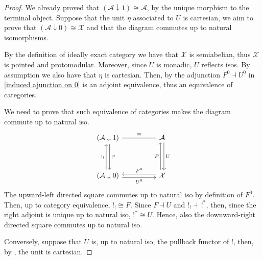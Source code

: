 \begin{subbox}{}
    \begin{proof}
        We already proved that $(\mathcal{A} \downarrow 1) \cong \mathcal{A}$, by the unique morphism to the terminal object. Suppose that the unit $\eta$ associated to $U$ is cartesian, we aim to prove that $(\mathcal{A} \downarrow 0) \cong \mathcal{X}$ and that the diagram commutes up to natural isomorphisms.

        By the definition of ideally exact category we have that $\mathcal{X}$ is semiabelian, thus $\mathcal{X}$ is pointed and protomodular. Moreover, since $U$ is monadic, $U$ reflects isos. By assumption we also have that $\eta$ is cartesian. Then, by  the adjunction $F^0 \dashv U^0$ in \eqref{induced ajunction on 0} is an adjoint equivalence, thus an equivalence of categories.
        
        We need to prove that such equivalence of categories makes the diagram commute up to natural iso.
        \[
\begin{tikzcd}
(\mathcal{A} \downarrow 1) \arrow[rr, "\cong", no head] \arrow[dd, "!^*", shift left]    &  & \mathcal{A} \arrow[dd, "U", shift left]                                 \\
                                                                                         &  &                                                                         \\
(\mathcal{A} \downarrow 0) \arrow[uu, "!_!", shift left] \arrow[rr, "U^0"', shift right] &  & \mathcal{X} \arrow[uu, "F", shift left] \arrow[ll, "F^0"', shift right]
\end{tikzcd}
        \]
        The upward-left directed square commutes up to natural iso by definition of $F^0$. Then, up to category equivalence, $!_!\cong F$. Since $F \dashv U$ and $!_! \dashv \ !^*$, then, since the right adjoint is unique up to natural iso, $!^*\cong U$. Hence, also the downward-right directed square commutes up to natural iso.
        
        Conversely, suppose that $U$ is, up to natural iso, the pullback functor of $!$, then, by , the unit is cartesian.
    \end{proof}
\end{subbox}

